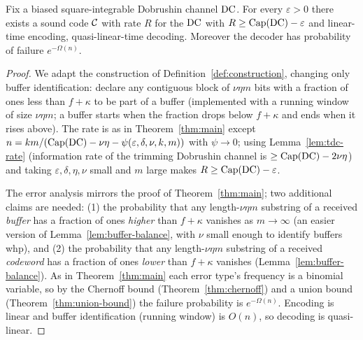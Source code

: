\begin{theorem}
  \label{thm:dobrushin-main}
  \notready
  Fix a biased square-integrable Dobrushin channel $\mathrm{DC}$. For every
  $\varepsilon>0$ there exists a sound code $\mathcal{C}$ with rate $R$ for the
  $\mathrm{DC}$ with $R\ge\mathrm{Cap}(\mathrm{DC})-\varepsilon$ and linear-time encoding,
  quasi-linear-time decoding. Moreover the decoder has probability of failure
  $e^{-\Omega(n)}$.
\end{theorem}
\begin{proof}
  We adapt the construction of Definition~\ref{def:construction}, changing only
  buffer identification: declare any contiguous block of $\nu\eta m$ bits with a
  fraction of ones less than $f+\kappa$ to be part of a buffer (implemented with a
  running window of size $\nu\eta m$; a buffer starts when the fraction drops
  below $f+\kappa$ and ends when it rises above). The rate is as in
  Theorem~\ref{thm:main} except $n=km/(\mathrm{Cap}(\mathrm{DC})-\nu\eta
   -\psi(\varepsilon,\delta,\nu,k,m))$ with $\psi\to0$; using
  Lemma~\ref{lem:tdc-rate} (information rate of the trimming Dobrushin channel is
  $\ge\mathrm{Cap}(\mathrm{DC})-2\nu\eta$) and taking $\varepsilon,\delta,\eta,\nu$ small and
  $m$ large makes $R\ge\mathrm{Cap}(\mathrm{DC})-\varepsilon$.

  The error analysis mirrors the proof of Theorem~\ref{thm:main}; two additional
  claims are needed: (1) the probability that any length-$\nu\eta m$ substring of
  a received \emph{buffer} has a fraction of ones \emph{higher} than $f+\kappa$
  vanishes as $m\to\infty$ (an easier version of
  Lemma~\ref{lem:buffer-balance}, with $\nu$ small enough to identify buffers whp),
  and (2) the probability that any length-$\nu\eta m$ substring of a received
  \emph{codeword} has a fraction of ones \emph{lower} than $f+\kappa$ vanishes
  (Lemma~\ref{lem:buffer-balance}). As in Theorem~\ref{thm:main} each error type's
  frequency is a binomial variable, so by the Chernoff bound
  (Theorem~\ref{thm:chernoff}) and a union bound (Theorem~\ref{thm:union-bound})
  the failure probability is $e^{-\Omega(n)}$. Encoding is linear and buffer
  identification (running window) is $O(n)$, so decoding is quasi-linear.
\end{proof}

